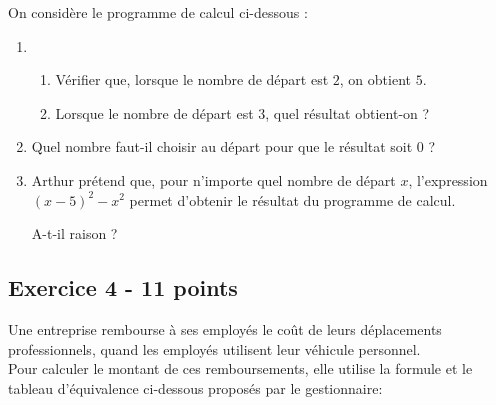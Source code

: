 \medskip

On considère le programme de calcul ci-dessous :

\parbox{0.35\linewidth}{
}
\hfill
\parbox{0.64\linewidth}{
\begin{enumerate}
    \item 
        \begin{enumerate}
            \item Vérifier que, lorsque le nombre de départ est $2$, on obtient $5$. 
            \item Lorsque le nombre de départ est $3$, quel résultat obtient-on ? \\
        \end{enumerate}
    \item Quel nombre faut-il choisir au départ pour que le résultat soit $0$ ? \\
    \item Arthur prétend que, pour n'importe quel nombre de départ $x$, l'expression $(x - 5)^2 - x^2$ permet d'obtenir le résultat du programme de calcul.
        
    A-t-il raison ?
\end{enumerate}}

\newpage

\subsection*{Exercice 4 - 11 points}

\medskip

Une entreprise rembourse à ses employés le coût de leurs déplacements professionnels, quand les employés utilisent leur véhicule personnel.\\

Pour calculer le montant de ces remboursements, elle utilise la formule et le tableau d'équivalence ci-dessous proposés par le gestionnaire:

